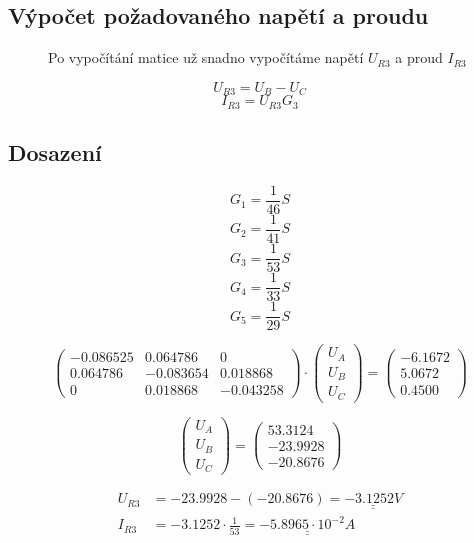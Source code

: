 \subsection{Výpočet požadovaného napětí a proudu}
\begin{figure}[H]
  Po vypočítání matice už snadno vypočítáme napětí $U_{R3}$ a proud $I_{R3}$

  $$ U_{R3} = U_B - U_C $$
  $$ I_{R3} = U_{R3} G_{3} $$
\end{figure}

\subsection{Dosazení}
\begin{figure}[H]

  $$ G_1 = \frac{1}{46} S $$
  $$ G_2 = \frac{1}{41} S $$
  $$ G_3 = \frac{1}{53} S$$
  $$ G_4 = \frac{1}{33} S$$
  $$ G_5 = \frac{1}{29} S$$

  $$
    \begin{pmatrix}
      -0.086525 & 0.064786  & 0         \\
      0.064786  & -0.083654 & 0.018868  \\
      0         & 0.018868  & -0.043258
    \end{pmatrix}
    \cdot
    \begin{pmatrix}
      U_A \\
      U_B \\
      U_C
    \end{pmatrix}
    =
    \begin{pmatrix}
      -6.1672 \\
      5.0672  \\
      0.4500
    \end{pmatrix}
  $$

  $$
    \begin{pmatrix}
      U_A \\
      U_B \\
      U_C
    \end{pmatrix}
    =
    \begin{pmatrix}
      53.3124  \\
      -23.9928 \\
      -20.8676
    \end{pmatrix}
  $$

  \begin{equation*}
    \begin{aligned}
      U_{R3} & = -23.9928 - (-20.8676) = \underline{\underline{-3.1252 V}}                    \\
      I_{R3} & = -3.1252 \cdot \frac{1}{53} = \underline{\underline{-5.8965 \cdot 10^{-2} A}}
    \end{aligned}
  \end{equation*}

\end{figure}
